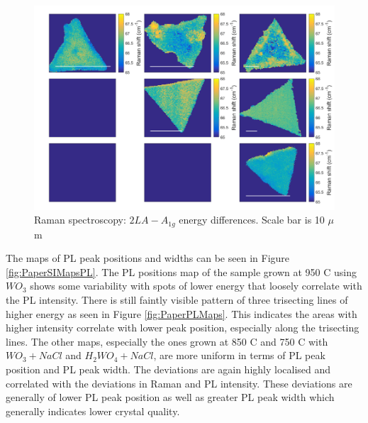\begin{figure}[h]
	\begin{center}
		\includegraphics[scale=0.3]{PaperSIMapsDifference.png}
		\caption{Raman spectroscopy: $2LA-A_{1g}$ energy differences. Scale bar is 10 $\mu$m}
		\label{fig:PaperSIMapsDifference}
	\end{center}
\end{figure}

The maps of PL peak positions and widths can be seen in Figure \ref{fig:PaperSIMapsPL}. The PL positions map of the sample grown at 950 {\degree}C using $WO_3$ shows some variability with spots of lower energy that loosely correlate with the PL intensity. There is still faintly visible pattern of three trisecting lines of higher energy as seen in Figure \ref{fig:PaperPLMaps}. This indicates the areas with higher intensity correlate with lower peak position, especially along the trisecting lines. The other maps, especially the ones grown at 850 {\degree}C and 750 {\degree}C with $WO_3 + NaCl$ and $H_2WO_4 + NaCl$, are more uniform in terms of PL peak position and PL peak width. The deviations are again highly localised and correlated with the deviations in Raman and PL intensity. These deviations are generally of lower PL peak position as well as greater PL peak width which generally indicates lower crystal quality.

